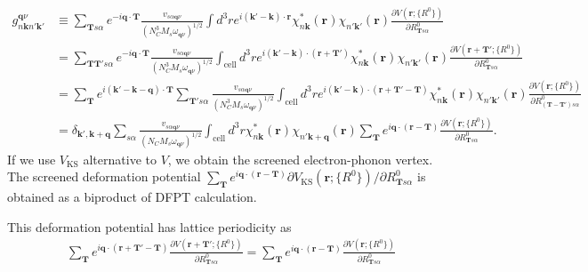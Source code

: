 \documentclass{article}
\begin{document}
\begin{align}
    g_{n\textbf{k} n'\textbf{k}'}^{\textbf{q}\nu} &\equiv
    \sum_{\textbf{T}s\alpha}
    e^{-i\textbf{q}\cdot\textbf{T}} 
    \frac{v_{s\alpha \textbf{q}\nu}}{(N_C^3 M_s \omega_{\textbf{q}\nu})^{1/2}} 
    \int d^3 r e^{i(\textbf{k}'-\textbf{k}) \cdot \textbf{r}}
    \chi_{n\textbf{k}}^*(\textbf{r})\chi_{n'\textbf{k}'}(\textbf{r})
    \frac{\partial V(\textbf{r};\{R^0\})}{\partial R^0_{\textbf{T}s\alpha}}
    \nonumber \\
    &= 
    \sum_{\textbf{T} \textbf{T}'s\alpha}
    e^{-i\textbf{q}\cdot\textbf{T}} 
    \frac{v_{s\alpha \textbf{q}\nu}}{(N_C^3 M_s \omega_{\textbf{q}\nu})^{1/2}} 
    \int_{\textrm{cell}} d^3 r
    e^{i(\textbf{k}'-\textbf{k}) \cdot (\textbf{r}+\textbf{T}')}
    \chi_{n\textbf{k}}^*(\textbf{r})\chi_{n'\textbf{k}'}(\textbf{r})
    \frac{\partial V(\textbf{r}+\textbf{T}';\{R^0\})}{\partial R^0_{\textbf{T}s\alpha}}
    \nonumber \\
    &= 
    \sum_{\textbf{T}}
    e^{i(\textbf{k}'-\textbf{k}-\textbf{q})\cdot\textbf{T}} 
    \sum_{\textbf{T}'s\alpha}
    \frac{v_{s\alpha \textbf{q}\nu}}{(N_C^3 M_s \omega_{\textbf{q}\nu})^{1/2}} 
    \int_{\textrm{cell}} d^3 r
    e^{i(\textbf{k}'-\textbf{k}) \cdot (\textbf{r}+\textbf{T}'-\textbf{T})}
    \chi_{n\textbf{k}}^*(\textbf{r})\chi_{n'\textbf{k}'}(\textbf{r})
    \frac{\partial V(\textbf{r};\{R^0\})}{\partial R^0_{(\textbf{T}-\textbf{T}')s\alpha}}
    \nonumber \\
    &= 
    \delta_{\textbf{k}',\textbf{k}+\textbf{q}}
    \sum_{s\alpha}
    \frac{v_{s\alpha \textbf{q}\nu}}{(N_C M_s \omega_{\textbf{q}\nu})^{1/2}} 
    \int_{\textrm{cell}} d^3 r
    \chi_{n\textbf{k}}^*(\textbf{r})\chi_{n'\textbf{k}+\textbf{q}}(\textbf{r})
    \sum_{\textbf{T}}e^{i \textbf{q} \cdot (\textbf{r}-\textbf{T})}
    \frac{\partial V(\textbf{r};\{R^0\})}{\partial R^0_{\textbf{T}s\alpha}}.
\end{align}
If we use $V_{\textrm{KS}}$ alternative to $V$, we obtain the screened electron-phonon vertex.
The screened deformation potential $\sum_{\textbf{T}}e^{i \textbf{q} \cdot (\textbf{r}-\textbf{T})} \partial V_\textrm{KS}(\textbf{r};\{R^0\})/\partial R^0_{\textbf{T}s\alpha}$ is obtained as a biproduct of DFPT calculation.

This deformation potential has lattice periodicity as
\begin{align}
    \sum_{\textbf{T}}e^{i \textbf{q} \cdot (\textbf{r}+\textbf{T}'-\textbf{T})}
    \frac{\partial V(\textbf{r}+\textbf{T}';\{R^0\})}{\partial R^0_{\textbf{T}s\alpha}}
    =
    \sum_{\textbf{T}}e^{i \textbf{q} \cdot (\textbf{r}-\textbf{T})}
    \frac{\partial V(\textbf{r};\{R^0\})}{\partial R^0_{\textbf{T}s\alpha}}
\end{align}
\end{document}
